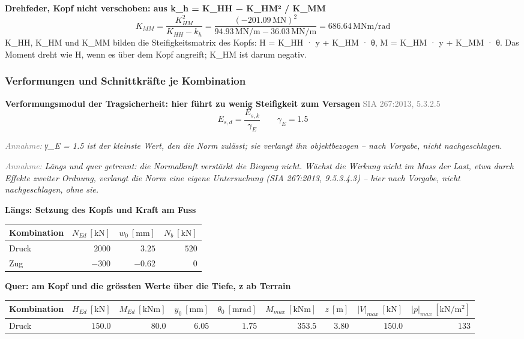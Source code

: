\documentclass[11pt,a4paper]{article}
\newcommand{\normref}[1]{{\small\textcolor{gray}{#1}}}
\newcommand{\hinweis}[2]{\par\noindent\textcolor{gray}{\textit{#1:}} \textit{#2}\par}
\begin{document}
\noindent\textbf{Drehfeder, Kopf nicht verschoben: aus k\_h = K\_HH − K\_HM² / K\_MM}
\begin{equation*}
K_{MM} = \frac{K_{HM}^{2}}{K_{HH} - k_h} = \frac{\left(-201.09\,\mathrm{MN}\right)^{2}}{94.93\,\mathrm{MN}/\mathrm{m} - 36.03\,\mathrm{MN}/\mathrm{m}} = 686.64\,\mathrm{MNm}/\mathrm{rad}
\end{equation*}
K\_HH, K\_HM und K\_MM bilden die Steifigkeitsmatrix des Kopfs: H = K\_HH · y + K\_HM · θ, M = K\_HM · y + K\_MM · θ. Das Moment dreht wie H, wenn es über dem Kopf angreift; K\_HM ist darum negativ.

\subsubsection{Verformungen und Schnittkräfte je Kombination}
\noindent\textbf{Verformungsmodul der Tragsicherheit: hier führt zu wenig Steifigkeit zum Versagen} \hfill \normref{SIA 267:2013, 5.3.2.5}
\begin{equation*}
E_{s,d} = \frac{E_{s,k}}{\gamma_E} \qquad \gamma_E = 1.5
\end{equation*}
\hinweis{Annahme}{γ\_E = 1.5 ist der kleinste Wert, den die Norm zulässt; sie verlangt ihn objektbezogen -- nach Vorgabe, nicht nachgeschlagen.}
\hinweis{Annahme}{Längs und quer getrennt: die Normalkraft verstärkt die Biegung nicht. Wächst die Wirkung nicht im Mass der Last, etwa durch Effekte zweiter Ordnung, verlangt die Norm eine eigene Untersuchung (SIA 267:2013, 9.5.3.4.3) -- hier nach Vorgabe, nicht nachgeschlagen, ohne sie.}
\noindent\textbf{Längs: Setzung des Kopfs und Kraft am Fuss}
\begin{longtable}{lrrr}
\hline
Kombination & $N_{Ed}\ [\mathrm{kN}]$ & $w_0\ [\mathrm{mm}]$ & $N_b\ [\mathrm{kN}]$ \\
\hline
\endhead
Druck & $2000$ & $3.25$ & $520$ \\
Zug & $-300$ & $-0.62$ & $0$ \\
\hline
\end{longtable}
\noindent\textbf{Quer: am Kopf und die grössten Werte über die Tiefe, z ab Terrain}
\begin{longtable}{lrrrrrrrr}
\hline
Kombination & $H_{Ed}\ [\mathrm{kN}]$ & $M_{Ed}\ [\mathrm{kNm}]$ & $y_0\ [\mathrm{mm}]$ & $\theta_0\ [\mathrm{mrad}]$ & $M_{max}\ [\mathrm{kNm}]$ & $z\ [\mathrm{m}]$ & $|V|_{max}\ [\mathrm{kN}]$ & $|p|_{max}\ [\mathrm{kN/m^2}]$ \\
\hline
\endhead
Druck & $150.0$ & $80.0$ & $6.05$ & $1.75$ & $353.5$ & $3.80$ & $150.0$ & $133$ \\
\hline
\end{longtable}
\end{document}
